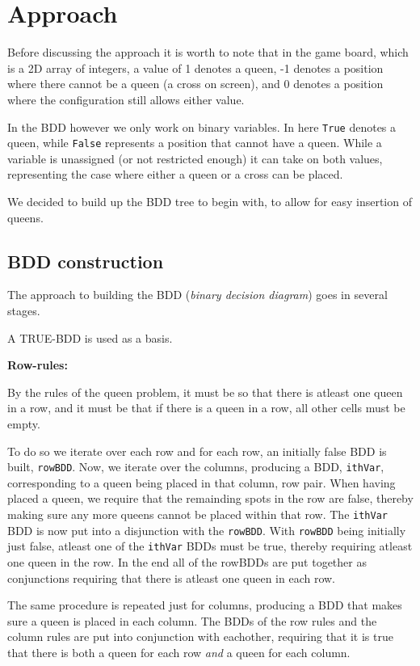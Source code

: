 
\section{Approach}
Before discussing the approach it is worth to note that in the game board, which is a 2D array of integers, a value of 1 denotes a queen, -1 denotes a position where there cannot be a queen (a cross on screen), and 0 denotes a position where the configuration still allows either value.

\newpar In the BDD however we only work on binary variables. In here \texttt{True} denotes a queen, while \texttt{False} represents a position that cannot have a queen. While a variable is unassigned (or not restricted enough) it can take on both values, representing the case where either a queen or a cross can be placed.

We decided to build up the BDD tree to begin with, to allow for easy insertion of queens.

\subsection{BDD construction}
The approach to building the BDD (\textit{binary decision diagram}) goes in several stages.

A TRUE-BDD is used as a basis. 

\textbf{Row-rules:}

By the rules of the queen problem, it must be so that there is atleast one queen in a row, and it must be that if there is a queen in a row, all other cells must be empty.

To do so we iterate over each row and for each row, an initially false BDD is built, \texttt{rowBDD}. Now, we iterate over the columns, producing a BDD, \texttt{ithVar}, corresponding to a queen being placed in that column, row pair. When having placed a queen, we require that the remainding spots in the row are false, thereby making sure any more queens cannot be placed within that row. The \texttt{ithVar} BDD is now put into a disjunction with the \texttt{rowBDD}.  With \texttt{rowBDD} being initially just false, atleast one of the \texttt{ithVar} BDDs must be true, thereby requiring atleast one queen in the row. In the end all of the rowBDDs are put together as conjunctions requiring that there is atleast one queen in each row.

\newpar The same procedure is repeated just for columns, producing a BDD that makes sure a queen is placed in each column. The BDDs of the row rules and the column rules are put into conjunction with eachother, requiring that it is true that there is both a queen for each row \textit{and} a queen for each column.

